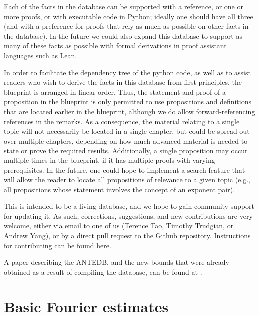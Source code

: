 Each of the facts in the database can be supported with a reference, or one or more proofs, or with executable code in Python; ideally one should have all three (and with a preference for proofs that rely as much as possible on other facts in the database).  In the future we could also expand this database to support as many of these facts as possible with formal derivations in proof assistant languages such as Lean.

In order to facilitate the dependency tree of the python code, as well as to assist readers who wish to derive the facts in this database from first principles, the blueprint is arranged in linear order.  Thus, the statement and proof of a proposition in the blueprint is only permitted to use propositions and definitions that are located earlier in the blueprint, although we do allow forward-referencing references in the remarks.  As a consequence, the material relating to a single topic will not necessarily be located in a single chapter, but could be spread out over multiple chapters, depending on how much advanced material is needed to state or prove the required results.  Additionally, a single proposition may occur multiple times in the blueprint, if it has multiple proofs with varying prerequisites.  In the future, one could hope to implement a search feature that will allow the reader to locate all propositions of relevance to a given topic (e.g., all propositions whose statement involves the concept of an exponent pair).

This is intended to be a living database, and we hope to gain community support for updating it.  As such, corrections, suggestions, and new contributions are very welcome, either via email to one of us (\href{mailto:tao@math.ucla.edu}{Terence Tao}, \href{mailto:timothy.trudgian@unsw.edu.au}{Timothy Trudgian}, or \href{mailto:andrew.yang1@unsw.edu.au}{Andrew Yang}), or by a direct pull request to the \href{https://github.com/teorth/expdb}{Github repository}.  Instructions for contributing can be found \href{https://github.com/teorth/expdb/blob/main/CONTRIBUTING.md}{here}.

A paper describing the ANTEDB, and the new bounds that were already obtained as a result of compiling the database, can be found at \cite{tao-trudgian-yang}.


\chapter{Basic Fourier estimates}\label{l2-chapter}

